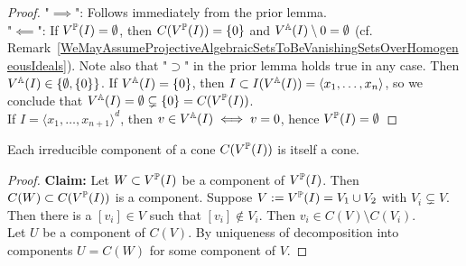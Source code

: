     \begin{proof}
        "$\implies$": Follows immediately from the prior lemma.\\
        "$\impliedby$": If $V^{\mathbb{P}}(I)= \emptyset$, then $C(V^{\mathbb{P}}(I))=\{0\}$ and $V^{\mathbb{A}}(I)\setminus 0 = \emptyset$ (cf. Remark~\ref{WeMayAssumeProjectiveAlgebraicSetsToBeVanishingSetsOverHomogeneousIdeals}). Note also that "$\supset$" in the prior lemma holds true in any case. Then $V^{\mathbb{A}}(I)\in\{\emptyset, \{0\}\}$. If $V^{\mathbb{A}}(I)=\{0\}$, then $I\subset I(V^{\mathbb{A}}(I))=\langle x_1,\dots,x_n\rangle$, so we conclude that $V^{\mathbb{A}}(I)=\emptyset\subsetneq \{0\}= C(V^{\mathbb{P}}(I))$.\\
        If $I=\langle x_1,\dots,x_{n+1}\rangle^d$, then $v\in V^{\mathbb{A}}(I) \iff v=0$, hence $V^{\mathbb{P}}(I)=\emptyset$
    \end{proof}
    \begin{proposition}
        Each irreducible component of a cone $C(V^{\mathbb{P}}(I))$ is itself a cone.  
    \end{proposition}
    \begin{proof}
        \textbf{Claim:} Let $W\subset V^{\mathbb{P}}(I)$ be a component of $V^{\mathbb{P}}(I)$. Then $C(W)\subset C(V^{\mathbb{P}}(I))$ is a component. Suppose $V:= V^{\mathbb{P}}(I) = V_1\cup V_2$ with $V_i\subsetneq V$. Then there is a $[v_i]\in V$ such that $[v_i]\notin V_i$. Then $v_i\in C(V)\setminus C(V_i)$.\\
        Let $U$ be a component of $C(V)$. By uniqueness of decomposition into components $U=C(W)$ for some component of $V$.
    \end{proof}
